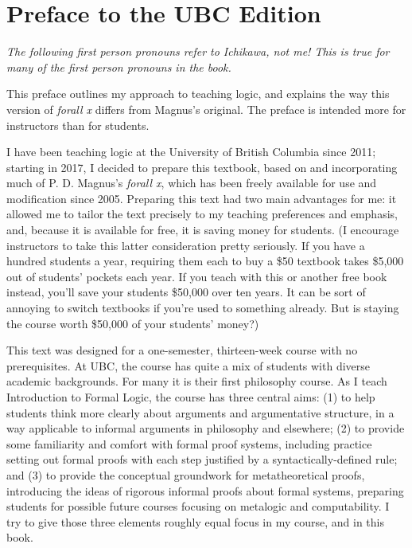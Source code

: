 \chapter*{Preface to the UBC Edition}
\label{ch.preface}

\textit{The following first person pronouns refer to Ichikawa, not me! This is true for many of the first person pronouns in the book.}

This preface outlines my approach to teaching logic, and explains the way this version of \emph{forall x} differs from Magnus's original. The preface is intended more for instructors than for students. 

I have been teaching logic at the University of British Columbia since 2011; starting in 2017, I decided to prepare this textbook, based on and incorporating much of P. D. Magnus's \emph{forall x}, which has been freely available for use and modification since 2005. Preparing this text had two main advantages for me: it allowed me to tailor the text precisely to my teaching preferences and emphasis, and, because it is available for free, it is saving money for students. (I encourage instructors to take this latter consideration pretty seriously. If you have a hundred students a year, requiring them each to buy a \$50 textbook takes \$5,000 out of students' pockets each year. If you teach with this or another free book instead, you'll save your students \$50,000 over ten years. It can be sort of annoying to switch textbooks if you're used to something already. But is staying the course worth \$50,000 of your students' money?)

This text was designed for a one-semester, thirteen-week course with no prerequisites. At UBC, the course has quite a mix of students with diverse academic backgrounds. For many it is their first philosophy course. As I teach Introduction to Formal Logic, the course has three central aims: (1) to help students think more clearly about arguments and argumentative structure, in a way applicable to informal arguments in philosophy and elsewhere; (2) to provide some familiarity and comfort with formal proof systems, including practice setting out formal proofs with each step justified by a syntactically-defined rule; and (3) to provide the conceptual groundwork for metatheoretical proofs, introducing the ideas of rigorous informal proofs about formal systems, preparing students for possible future courses focusing on metalogic and computability. I try to give those three elements roughly equal focus in my course, and in this book.

